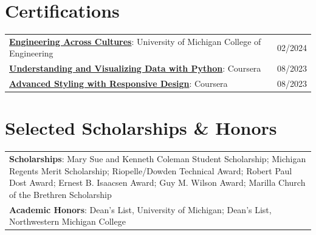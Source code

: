 \documentclass[letterpaper,11pt]{article}
\begin{document}
\section{Certifications}
    \small{
        \begin{tabularx}{\textwidth}{@{}X r@{}}
            \href{https://www.linkedin.com/in/aethom/overlay/Certifications/700791707/treasury?profileId=ACoAADN5bTEB18k0yztAXyUopICM-9S8EoTbpdo}{\textbf{Engineering Across Cultures}}: University of Michigan College of Engineering & 02/2024 \\
            \href{https://www.coursera.org/account/accomplishments/certificate/4S2MW9LSCTJC}{\textbf{Understanding and Visualizing Data with Python}}: Coursera & 08/2023 \\
            \href{https://www.coursera.org/account/accomplishments/certificate/G8BQCKNRNECB}{\textbf{Advanced Styling with Responsive Design}}: Coursera & 08/2023 \\
        \end{tabularx}
    }

\section{Selected Scholarships \& Honors}
    \small{
        \begin{tabularx}{\textwidth}{@{}X@{}}
            \textbf{Scholarships}: Mary Sue and Kenneth Coleman Student Scholarship; Michigan Regents Merit Scholarship; Riopelle/Dowden Technical Award; Robert Paul Dost Award; Ernest B. Isaacsen Award; Guy M. Wilson Award; Marilla Church of the Brethren Scholarship \\
            \textbf{Academic Honors}: Dean's List, University of Michigan; Dean's List, Northwestern Michigan College \\
        \end{tabularx}
    }

\end{document}
